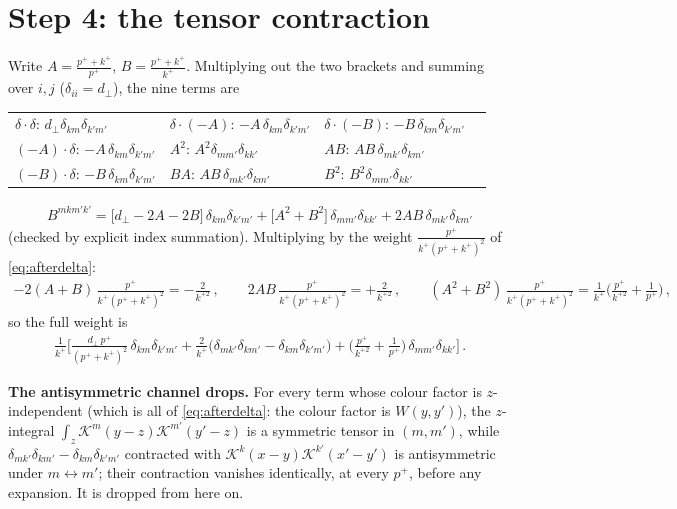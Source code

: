 \documentclass[9pt]{article}
\begin{document}
\section{Step 4: the tensor contraction}
Write $A=\frac{p^{+}+k^{+}}{p^{+}}$, $B=\frac{p^{+}+k^{+}}{k^{+}}$. Multiplying out the two
brackets and summing over $i,j$ ($\delta_{ii}=d_{\perp}$), the nine terms are
\begin{center}
\begin{tabular}{llll}
$\delta\!\cdot\!\delta$: $d_{\perp}\delta_{km}\delta_{k'm'}$ &
$\delta\!\cdot\!(-A)$: $-A\,\delta_{km}\delta_{k'm'}$ &
$\delta\!\cdot\!(-B)$: $-B\,\delta_{km}\delta_{k'm'}$ & \\
$(-A)\!\cdot\!\delta$: $-A\,\delta_{km}\delta_{k'm'}$ &
$A^{2}$: $A^{2}\delta_{mm'}\delta_{kk'}$ &
$AB$: $AB\,\delta_{mk'}\delta_{km'}$ & \\
$(-B)\!\cdot\!\delta$: $-B\,\delta_{km}\delta_{k'm'}$ &
$BA$: $AB\,\delta_{mk'}\delta_{km'}$ &
$B^{2}$: $B^{2}\delta_{mm'}\delta_{kk'}$ &
\end{tabular}
\end{center}
\begin{align}
B^{mkm'k'}=\big[d_{\perp}-2A-2B\big]\,\delta_{km}\delta_{k'm'}
+\big[A^{2}+B^{2}\big]\,\delta_{mm'}\delta_{kk'}
+2AB\,\delta_{mk'}\delta_{km'}
\end{align}
(checked by explicit index summation). Multiplying by the weight
$\frac{p^{+}}{k^{+}(p^{+}+k^{+})^{2}}$ of \eqref{eq:afterdelta}:
\begin{align}
-2(A+B)\,\frac{p^{+}}{k^{+}(p^{+}+k^{+})^{2}}=-\frac{2}{k^{+2}}\,,\qquad
2AB\,\frac{p^{+}}{k^{+}(p^{+}+k^{+})^{2}}=+\frac{2}{k^{+2}}\,,\qquad
(A^{2}+B^{2})\,\frac{p^{+}}{k^{+}(p^{+}+k^{+})^{2}}
=\frac{1}{k^{+}}\Big(\frac{p^{+}}{k^{+2}}+\frac{1}{p^{+}}\Big)\,,
\end{align}
so the full weight is
\begin{align}\label{eq:weights}
\frac{1}{k^{+}}\Bigg[\frac{d_{\perp}\,p^{+}}{(p^{+}+k^{+})^{2}}\,\delta_{km}\delta_{k'm'}
+\frac{2}{k^{+}}\big(\delta_{mk'}\delta_{km'}-\delta_{km}\delta_{k'm'}\big)
+\Big(\frac{p^{+}}{k^{+2}}+\frac{1}{p^{+}}\Big)\,\delta_{mm'}\delta_{kk'}\Bigg]\,.
\end{align}

\textbf{The antisymmetric channel drops.} For every term whose colour factor is
$z$-independent (which is all of \eqref{eq:afterdelta}: the colour factor is $W(y,y')$), the
$z$-integral $\int_{z}\mathcal K^{m}(y-z)\mathcal K^{m'}(y'-z)$ is a symmetric tensor in
$(m,m')$, while $\delta_{mk'}\delta_{km'}-\delta_{km}\delta_{k'm'}$ contracted with
$\mathcal K^{k}(x-y)\mathcal K^{k'}(x'-y')$ is antisymmetric under $m\leftrightarrow m'$;
their contraction vanishes identically, at every $p^{+}$, before any expansion. It is dropped
from here on.
\end{document}
